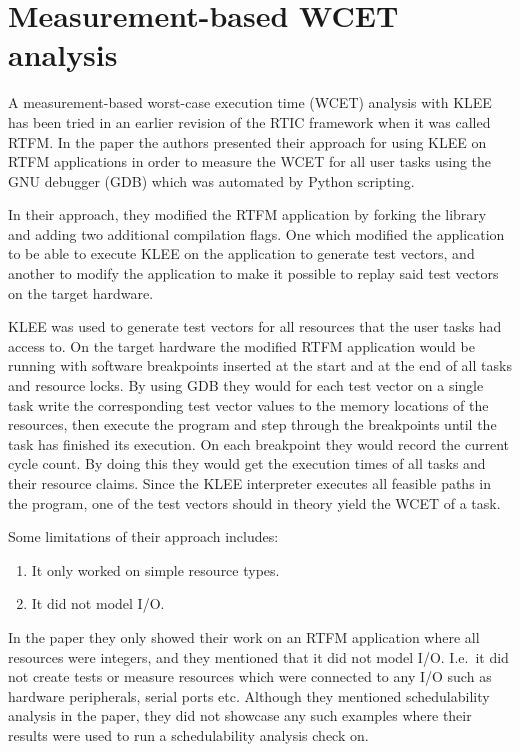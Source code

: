 \section{Measurement-based WCET analysis}
A measurement-based worst-case execution time (WCET) analysis with KLEE has
been tried in an earlier revision of the RTIC framework when it was called
RTFM\cite{lindner}. In the paper the authors presented their approach for using
KLEE on RTFM applications in order to measure the WCET for all user tasks
using the GNU debugger (GDB) which was automated by Python scripting.

In their approach, they modified the RTFM application by forking the library and
adding two additional compilation flags. One which modified the application to be
able to execute KLEE on the application to generate test vectors, and another
to modify the application to make it possible to replay said test vectors on
the target hardware.

KLEE was used to generate test vectors for all resources that the user tasks
had access to. On the target hardware the modified RTFM application would be
running with software breakpoints inserted at the start and at the end of all
tasks and resource locks. By using GDB they would for each test vector on a
single task write the corresponding test vector values to the memory locations
of the resources, then execute the program and step through the breakpoints
until the task has finished its execution. On each breakpoint they would record
the current cycle count. By doing this they would get the execution times of
all tasks and their resource claims. Since the KLEE interpreter executes all
feasible paths in the program, one of the test vectors should in theory yield
the WCET of a task.

Some limitations of their approach includes:
\begin{enumerate}
    \item It only worked on simple resource types.
    \item It did not model I/O.
\end{enumerate}
In the paper they only showed their work on an RTFM application where all
resources were integers, and they mentioned that it did not model I/O. I.e.\
it did not create tests or measure resources which were connected to any I/O
such as hardware peripherals, serial ports etc. Although they mentioned
schedulability analysis in the paper, they did not showcase any such examples
where their results were used to run a schedulability analysis check on.


